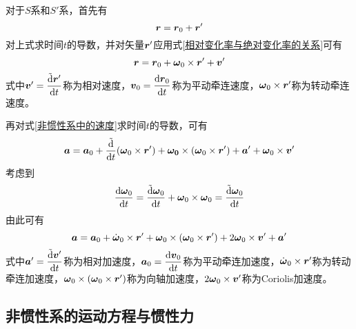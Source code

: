 对于$S$系和$S'$系，首先有
\begin{equation*}
	\boldsymbol{r} = \boldsymbol{r}_0 + \boldsymbol{r}'
\end{equation*}
对上式求时间$t$的导数，并对矢量$\boldsymbol{r}'$应用式\eqref{相对变化率与绝对变化率的关系}可有
\begin{equation}
	\boldsymbol{r} = \boldsymbol{r}_0 + \boldsymbol{\omega}_0 \times \boldsymbol{r}' + \boldsymbol{v}'
	\label{非惯性系中的速度}
\end{equation}
式中$\boldsymbol{v}' = \dfrac{\tilde{\mathrm{d}} \boldsymbol{r}'}{\mathrm{d} t}$称为{\heiti 相对速度}，$\boldsymbol{v}_0 = \dfrac{\mathrm{d} \boldsymbol{r}_0}{\mathrm{d} t}$称为{\heiti 平动牵连速度}，$\boldsymbol{\omega}_0 \times \boldsymbol{r}'$称为{\heiti 转动牵连速度}。

再对式\eqref{非惯性系中的速度}求时间$t$的导数，可有
\begin{align*}
	\boldsymbol{a} = \boldsymbol{a}_0 + \frac{\tilde{\mathrm{d}}}{\mathrm{d} t} (\boldsymbol{\omega}_0 \times \boldsymbol{r}') + \boldsymbol{\omega_0} \times (\boldsymbol{\omega}_0 \times \boldsymbol{r}') + \boldsymbol{a}' + \boldsymbol{\omega}_0 \times \boldsymbol{v}'
\end{align*}
考虑到
\begin{equation*}
	\frac{\mathrm{d} \boldsymbol{\omega}_0}{\mathrm{d} t} = \frac{\tilde{\mathrm{d}} \boldsymbol{\omega}_0}{\mathrm{d} t} + \boldsymbol{\omega}_0 \times \boldsymbol{\omega}_0 = \frac{\tilde{\mathrm{d}} \boldsymbol{\omega}_0}{\mathrm{d} t}
\end{equation*}
由此可有
\begin{equation}
	\boldsymbol{a} = \boldsymbol{a}_0 + \dot{\boldsymbol{\omega}}_0 \times \boldsymbol{r}' + \boldsymbol{\omega}_0 \times (\boldsymbol{\omega}_0 \times \boldsymbol{r}') + 2\boldsymbol{\omega}_0 \times \boldsymbol{v}' + \boldsymbol{a}'
\end{equation}
式中$\boldsymbol{a}' = \dfrac{\tilde{\mathrm{d}} \boldsymbol{v}'}{\mathrm{d} t}$称为{\heiti 相对加速度}，$\boldsymbol{a}_0 = \dfrac{\mathrm{d} \boldsymbol{v}_0}{\mathrm{d} t}$称为{\heiti 平动牵连加速度}，$\dot{\boldsymbol{\omega}}_0 \times \boldsymbol{r}'$称为{\heiti 转动牵连加速度}，$\boldsymbol{\omega}_0 \times (\boldsymbol{\omega}_0 \times \boldsymbol{r}')$称为{\heiti 向轴加速度}，$2\boldsymbol{\omega}_0 \times \boldsymbol{v}'$称为{\heiti Coriolis加速度}。

\subsection{非惯性系的运动方程与惯性力}

